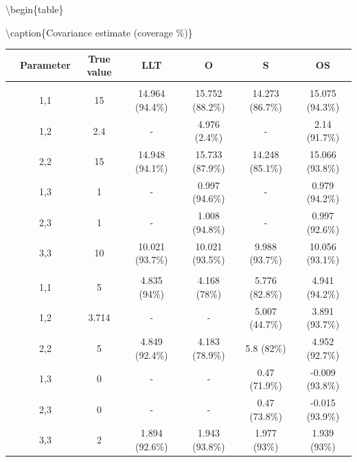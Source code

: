 \documentclass[
]{article}
\begin{document}
\textbackslash begin\{table\}

\textbackslash caption\{\label{tab:unnamed-chunk-31}Covariance estimate (coverage \%)\}
\centering

\begin{tabular}[t]{ccccccc}
\toprule
 & Parameter & True value & LLT & O & S & OS\\
\midrule
\addlinespace[0.3em]
\multicolumn{7}{l}{\textbf{Observation Error}}\\
\hspace{1em} & 1,1 & 15 & 14.964 (94.4\%) & 15.752 (88.2\%) & 14.273 (86.7\%) & 15.075 (94.3\%)\\
\cmidrule{2-7}
\hspace{1em} & 1,2 & 2.4 & - & 4.976 (2.4\%) & - & 2.14 (91.7\%)\\
\cmidrule{2-7}
\hspace{1em} & 2,2 & 15 & 14.948 (94.1\%) & 15.733 (87.9\%) & 14.248 (85.1\%) & 15.066 (93.8\%)\\
\cmidrule{2-7}
\hspace{1em} & 1,3 & 1 & - & 0.997 (94.6\%) & - & 0.979 (94.2\%)\\
\cmidrule{2-7}
\hspace{1em} & 2,3 & 1 & - & 1.008 (94.8\%) & - & 0.997 (92.6\%)\\
\cmidrule{2-7}
\hspace{1em} & 3,3 & 10 & 10.021 (93.7\%) & 10.021 (93.5\%) & 9.988 (93.7\%) & 10.056 (93.1\%)\\
\cmidrule{1-7}
\addlinespace[0.3em]
\multicolumn{7}{l}{\textbf{State Process}}\\
\hspace{1em} & 1,1 & 5 & 4.835 (94\%) & 4.168 (78\%) & 5.776 (82.8\%) & 4.941 (94.2\%)\\
\cmidrule{2-7}
\hspace{1em} & 1,2 & 3.714 & - & - & 5.007 (44.7\%) & 3.891 (93.7\%)\\
\cmidrule{2-7}
\hspace{1em} & 2,2 & 5 & 4.849 (92.4\%) & 4.183 (78.9\%) & 5.8 (82\%) & 4.952 (92.7\%)\\
\cmidrule{2-7}
\hspace{1em} & 1,3 & 0 & - & - & 0.47 (71.9\%) & -0.009 (93.8\%)\\
\cmidrule{2-7}
\hspace{1em} & 2,3 & 0 & - & - & 0.47 (73.8\%) & -0.015 (93.9\%)\\
\cmidrule{2-7}
\hspace{1em} & 3,3 & 2 & 1.894 (92.6\%) & 1.943 (93.8\%) & 1.977 (93\%) & 1.939 (93\%)\\
\bottomrule
\end{tabular}
\end{document}
